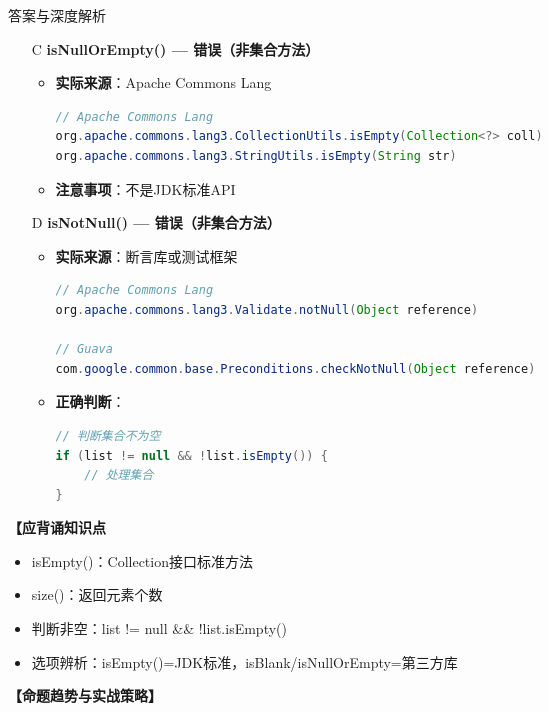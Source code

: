 \documentclass[12pt, a4paper]{ctexart}
\begin{document}
\begin{enumerate}[label=\textbf{\arabic*.}]
\begin{bluebox}{答案与深度解析}
\begin{itemize}[leftmargin=*, nosep, label={}]
			      \item[C] \textbf{isNullOrEmpty() — 错误（非集合方法）}
			            \begin{itemize}[label={}, leftmargin=*, nosep]
				            \item \textbf{实际来源}：Apache Commons Lang
				                  \begin{lstlisting}[language=Java]
// Apache Commons Lang
org.apache.commons.lang3.CollectionUtils.isEmpty(Collection<?> coll)
org.apache.commons.lang3.StringUtils.isEmpty(String str)
				      \end{lstlisting}
				            \item \textbf{注意事项}：不是JDK标准API
			            \end{itemize}

			      \item[D] \textbf{isNotNull() — 错误（非集合方法）}
			            \begin{itemize}[label={}, leftmargin=*, nosep]
				            \item \textbf{实际来源}：断言库或测试框架
				                  \begin{lstlisting}[language=Java]
// Apache Commons Lang
org.apache.commons.lang3.Validate.notNull(Object reference)

// Guava
com.google.common.base.Preconditions.checkNotNull(Object reference)
				      \end{lstlisting}
				            \item \textbf{正确判断}：
				                  \begin{lstlisting}[language=Java]
// 判断集合不为空
if (list != null && !list.isEmpty()) {
    // 处理集合
}
				      \end{lstlisting}
			            \end{itemize}
		      \end{itemize}

		      \textbf{【应背诵知识点}
		      \begin{itemize}[label={}, nosep]
			      \item isEmpty()：Collection接口标准方法
			      \item size()：返回元素个数
			      \item 判断非空：list != null && !list.isEmpty()
			      \item 选项辨析：isEmpty()=JDK标准，isBlank/isNullOrEmpty=第三方库
		      \end{itemize}

		      \textbf{【命题趋势与实战策略】}


\end{bluebox}
\end{enumerate}
\end{document}
